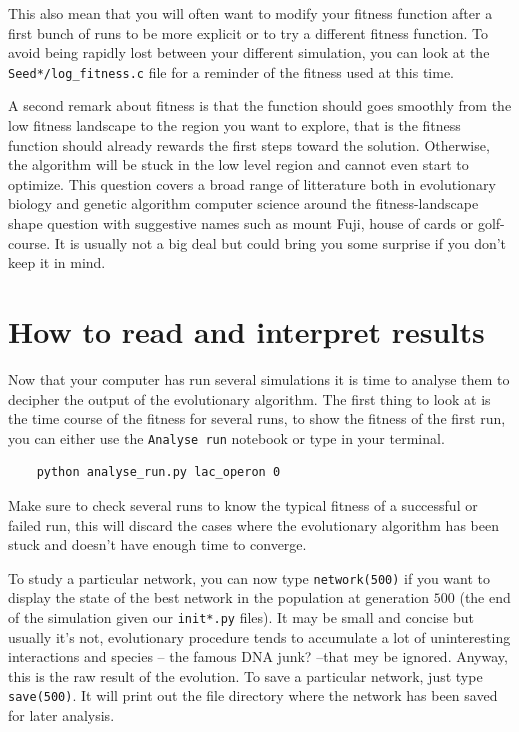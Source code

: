 \documentclass[]{article}
\begin{document}
This also mean that you will often want to modify your fitness function after
a first bunch of runs to be more explicit or to try a different fitness function.
To avoid being rapidly lost between your different simulation, you can
look at the \verb#Seed*/log_fitness.c# file for a reminder of the fitness
used at this time.

A second remark about fitness is that the function should goes smoothly
from the low fitness landscape to the region you want to explore, that
is the fitness function should already rewards the first steps toward the
solution. Otherwise, the algorithm will be stuck in the low level region
and cannot even start to optimize. This question covers a broad range of
litterature both in evolutionary biology and genetic algorithm computer
science around the fitness-landscape shape question with suggestive
names such as mount Fuji, house of cards or golf-course. It is usually
not a big deal but could bring you some surprise if you don't keep it in
mind.

\section{How to read and interpret
results}\label{how-to-read-and-interpret-results}

Now that your computer has run several simulations it is time to analyse
them to decipher the output of the evolutionary algorithm. The first
thing to look at is the time course of the fitness for several runs, to
show the fitness of the first run, you can either use the \verb#Analyse run#
notebook or type in your terminal.
\begin{verbatim}
    python analyse_run.py lac_operon 0
\end{verbatim}
Make sure to check several runs to know the typical fitness of
a successful or failed run, this will discard the cases where the evolutionary
algorithm has been stuck and doesn't have enough time to converge.

To study a particular network, you can now type \verb#network(500)# if you
want to display the state of the best network in the population at
generation $500$ (the end of the simulation given our \verb#init*.py# files).
It may be small and concise but usually it's not, evolutionary procedure
tends to accumulate a lot of uninteresting interactions and species -- the
famous DNA junk? --that mey be ignored.
Anyway, this is the raw result of the evolution. To save a particular
network, just type \verb#save(500)#. It will print out the file
directory where the network has been saved for later analysis.
\end{document}
